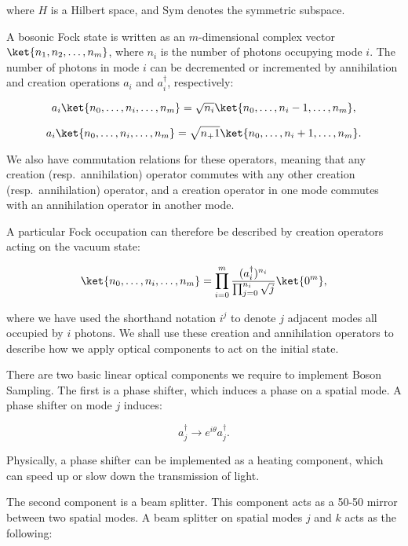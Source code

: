 \noindent where $H$ is a Hilbert space, and $\textrm{Sym}$ denotes the symmetric subspace.

A bosonic Fock state is written as an $m$-dimensional complex vector $\ket{n_1,n_2,\dots,n_m}$, where $n_i$ is the number of photons occupying mode $i$. The number of photons in mode $i$ can be decremented or incremented by annihilation and creation operations $a_i$ and $a_i^\dagger$, respectively:

\begin{equation}
a_i\ket{n_0,\dots,n_i,\dots,n_m} = \sqrt{n_i}\ket{n_0,\dots,n_i-1,\dots,n_m},
\end{equation}

\begin{equation}
a_i\ket{n_0,\dots,n_i,\dots,n_m} = \sqrt{n_+1}\ket{n_0,\dots,n_i+1,\dots,n_m}.
\end{equation}

We also have commutation relations for these operators, meaning that any creation (resp.\ annihilation) operator commutes with any other creation (resp.\ annihilation) operator, and a creation operator in one mode commutes with an annihilation operator in another mode.

A particular Fock occupation can therefore be described by creation operators acting on the vacuum state:

\begin{equation}
\ket{n_0,\dots,n_i,\dots,n_m} = \prod_{i=0}^m\frac{(a_i^\dagger)^{n_i}}{\prod_{j=0}^{n_i}\sqrt{j}}\ket{0^m},
\end{equation}

\noindent where we have used the shorthand notation $i^j$ to denote $j$ adjacent modes all occupied by $i$ photons. We shall use these creation and annihilation operators to describe how we apply optical components to act on the initial state.

There are two basic linear optical components we require to implement Boson Sampling. The first is a phase shifter, which induces a phase on a spatial mode. A phase shifter on mode $j$ induces:

\begin{equation}
a_j^\dagger \rightarrow e^{i\theta}a_j^\dagger.
\end{equation}

Physically, a phase shifter can be implemented as a heating component, which can speed up or slow down the transmission of light.

The second component is a beam splitter. This component acts as a 50-50 mirror between two spatial modes. A beam splitter on spatial modes $j$ and $k$ acts as the following:

